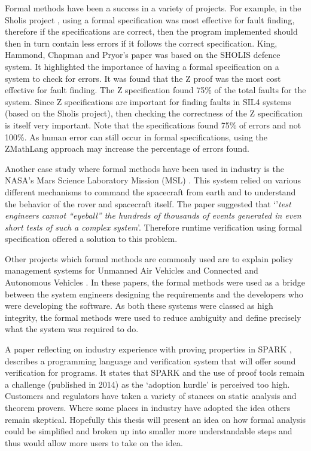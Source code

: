 Formal methods have been a success in a variety of projects. For example, in the
Sholis project \cite{sholis}, using a formal specification was most effective
for fault finding, therefore if the specifications are correct, then the program
implemented should then in turn contain less errors if it follows the correct
specification. King, Hammond, Chapman and Pryor's paper \cite{sholis} was based
on the SHOLIS defence system. It highlighted the importance of having a formal
specification on a system to check for errors. It was found that the Z proof was
the most cost effective for fault finding. The Z specification found 75\% of the
total faults for the system. Since Z specifications are important for finding
faults in SIL4 systems (based on the Sholis project), then checking the
correctness of the Z specification is itself very important. Note that the
specifications found 75\% of errors and not 100\%. As human error can still
occur in formal specifications, using the ZMathLang approach may increase the
percentage of errors found.

Another case study where formal methods have been used in industry is the NASA’s
Mars Science Laboratory Mission (MSL) \cite{DBLP:journals/corr/abs-1003-1682}.
This system relied on various different mechanisms to command the spacecraft
from earth and to understand the behavior of the rover and spacecraft itself.
The paper suggested that `'\textit{test engineers cannot “eyeball” the hundreds of
thousands of events generated in even short tests of such a complex system}'.
Therefore runtime verification using formal specification offered a solution to
this problem.

Other projects which formal methods are commonly used are to explain policy
management systems for Unmanned Air Vehicles \cite{agreemenetpatternsuav} and
Connected and Autonomous Vehicles \cite{agreemenetpatternscav}. In these papers,
the formal methods were used as a bridge between the system engineers designing
the requirements and the developers who were developing the software. As both
these systems were classed as high integrity, the formal methods were used to
reduce ambiguity and define precisely what the system was required to do.

A paper reflecting on industry experience with proving properties in SPARK
\cite{DBLP:conf/itp/ChapmanS14}, describes a programming language and
verification system that will offer sound verification for programs. It states
that SPARK and the use of proof tools remain a challenge (published in 2014) as
the `adoption hurdle' is perceived too high. Customers and regulators have taken
a variety of stances on static analysis and theorem provers. Where some places
in industry have adopted the idea others remain skeptical. Hopefully this thesis
will present an idea on how formal analysis could be simplified and broken up
into smaller more understandable steps and thus would allow more users to take
on the idea.


